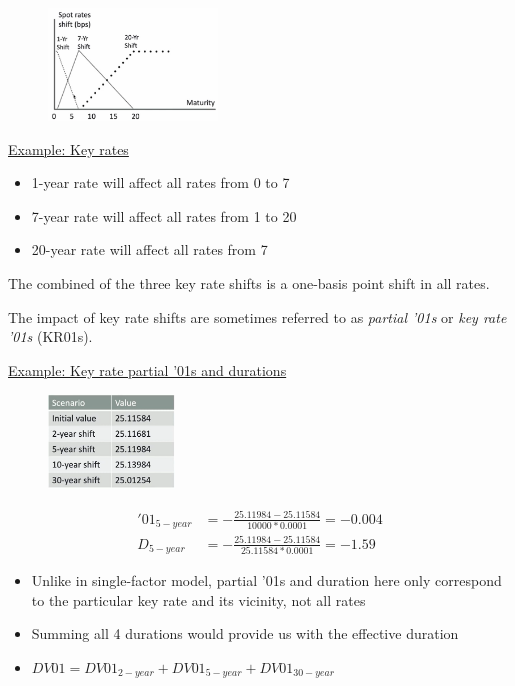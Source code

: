 \documentclass{article}
\begin{document}
\begin{figure}
    \centering    \includegraphics[width=0.4\textwidth]{rates.png}
\end{figure}

\underline{Example: Key rates}
\begin{itemize}
    \item 1-year rate will affect all rates from 0 to 7

    \item 7-year rate will affect all rates from 1 to 20

    \item 20-year rate will affect all rates from 7
\end{itemize}

The combined of the three key rate shifts is a one-basis point shift in all rates.

The impact of key rate shifts are sometimes referred to as \textit{partial '01s} or \textit{key rate '01s} (KR01s).

\underline{Example: Key rate partial '01s and durations}

\begin{figure}[h]
    \centering    \includegraphics[width=0.3\textwidth]{kr01.png}
\end{figure}


\begin{align*}
    '01_{5-year} &= -\frac{25.11984 - 25.11584}{10 000 * 0.0001} = -0.004
    \\
    D_{5-year} &= -\frac{25.11984 - 25.11584}{25.11584 * 0.0001} = -1.59
\end{align*}
    
\begin{itemize}
    \item Unlike in single-factor model, partial '01s and duration here only correspond to the particular key rate and its vicinity, not all rates

    \item Summing all 4 durations would provide us with the effective duration

    \item $DV01 = DV01_{2-year} + DV01_{5-year} + DV01_{30-year}$ 
\end{itemize}
\end{document}
